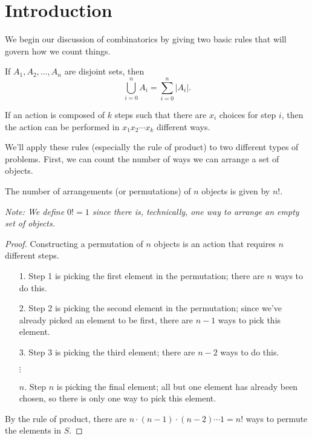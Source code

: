 \documentclass[../m55main.tex]{subfiles}
\begin{document}
\section{Introduction}
We begin our discussion of combinatorics by giving two basic rules that will govern how we count things.

\begin{theorem}
    If $A_1, A_2, \ldots, A_n$ are disjoint sets, then
    \[ \bigcup_{i=0}^n A_i = \sum_{i=0}^n |A_i|. \]
\end{theorem}


\begin{theorem}
    If an action is composed of $k$ steps such that there are $x_i$ choices for step $i$, then the action can be performed in $x_1 x_2 \cdots x_k$ different ways.
\end{theorem}


We'll apply these rules (especially the rule of product) to two different types of problems.
First, we can count the number of ways we can arrange a set of objects.

\begin{theorem}
    The number of arrangements (or permutations) of $n$ objects is given by $n!$. %

    \medskip
    \textit{Note: We define $0! = 1$ since there is, technically, one way to arrange an empty set of objects.}
\end{theorem}

\begin{proof}
    Constructing a permutation of $n$ objects is an action that requires $n$ different steps.
    \begin{itemize}
        \item [1.] Step 1 is picking the first element in the permutation; there are $n$ ways to do this.
        \item [2.] Step 2 is picking the second element in the permutation; since we've already picked an element to be first, there are $n-1$ ways to pick this element.
        \item [3.] Step 3 is picking the third element; there are $n-2$ ways to do this.
        \item [$\vdots$\phantom{.}]
        \item [$n$.] Step $n$ is picking the final element; all but one element has already been chosen, so there is only one way to pick this element.
    \end{itemize}
    By the rule of product, there are $n \cdot (n-1) \cdot (n-2) \cdots 1 = n!$ ways to permute the elements in $S$.
\end{proof}
\end{document}

